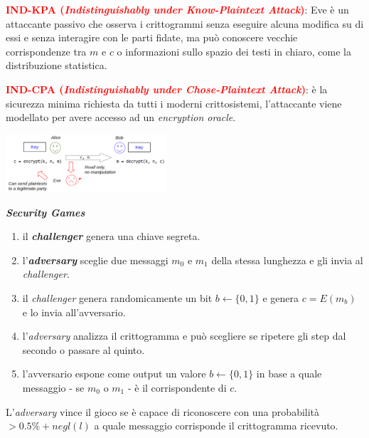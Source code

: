 \begin{flushleft}
    \textcolor{red}{\textbf{IND-KPA (\textit{Indistinguishably under Know-Plaintext Attack})}}: Eve è un attaccante passivo che osserva i crittogrammi senza eseguire alcuna modifica su di essi e senza interagire con le parti fidate, ma può conoscere vecchie corrispondenze tra $m$ e $c$ o informazioni sullo spazio dei testi in chiaro, come la distribuzione statistica.
    
    \smallskip

    \textcolor{red}{\textbf{IND-CPA (\textit{Indistinguishably under Chose-Plaintext Attack})}}: è la sicurezza minima richiesta da tutti i moderni crittosistemi, l'attaccante viene modellato per avere accesso ad un \textit{encryption oracle}.

    {\centering
        \includegraphics[width=0.45\textwidth]{img/ind_cpa.png}
    \par}

    \textbf{\textit{Security Games}}
    \begin{enumerate}[nosep]
        \item il \textbf{\textit{challenger}} genera una chiave segreta.
        \item l'\textbf{\textit{adversary}} sceglie due messaggi $m_0$ e $m_1$ della stessa lunghezza e gli invia al \textit{challenger}.
        \item il \textit{challenger} genera randomicamente un bit $b \leftarrow \{0, 1\}$ e genera $c = E(m_b)$ e lo invia all'avversario.
        \item l'\textit{adversary} analizza il crittogramma e può scegliere se ripetere gli step dal secondo o passare al quinto.
        \item l'avversario espone come output un valore $b \leftarrow \{0, 1\}$ in base a quale messaggio - se $m_0$ o $m_1$ - è il corrispondente di $c$.
    \end{enumerate}
    L'\textit{adversary} vince il gioco se è capace di riconoscere con una probabilità $ > 0.5\% + negl(l)$ a quale messaggio corrisponde il crittogramma ricevuto.
    
    \smallskip


\end{flushleft}
